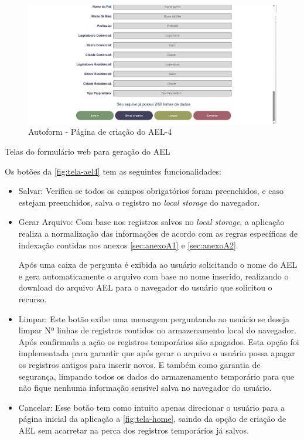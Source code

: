 \begin{figure}[H]
    \caption{\label{fig:tela-ael4}Autoform - Página de criação do AEL-4}
    \begin{center}
        \includegraphics[scale=0.5]{imagens/autoform-ael-gerar4.png}
    \end{center}
\end{figure}

Telas do formulário web para geração do AEL

Os botões da \autoref{fig:tela-ael4} tem as seguintes funcionalidades:
\begin{itemize}
    \item Salvar: Verifica se todos os campos obrigatórios foram preenchidos, e caso estejam preenchidos, salva o registro no \textit{local storage} do navegador.
    \item Gerar Arquivo: Com base nos registros salvos no \textit{local storage}, a aplicação realiza a normalização das informações de acordo com as regras específicas de indexação contidas nos anexos \autoref{sec:anexoA1} e \autoref{sec:anexoA2}.
     
    Após uma caixa de pergunta é exibida ao usuário solicitando o nome do AEL e gera automaticamente o arquivo com base no nome inserido, realizando o download do arquivo AEL para o navegador do usuário que solicitou o recurso. 
    \item Limpar: Este botão exibe uma mensagem perguntando ao usuário se deseja limpar Nº linhas de registros contidos no armazenamento local do navegador.  Após confirmada a ação os registros temporários são apagados. 
    Esta opção foi implementada para garantir que após gerar o arquivo o usuário possa apagar os registros antigos para inserir novos. E também como garantia de segurança, limpando todos os dados do armazenamento temporário para  que não fique nenhuma informação sensível salva no navegador do usuário.
    \item Cancelar: Esse botão tem como intuito apenas direcionar o usuário para a página inicial da aplicação a \autoref{fig:tela-home}, saindo da opção de criação de AEL sem acarretar na perca dos registros temporários já salvos.
\end{itemize}

